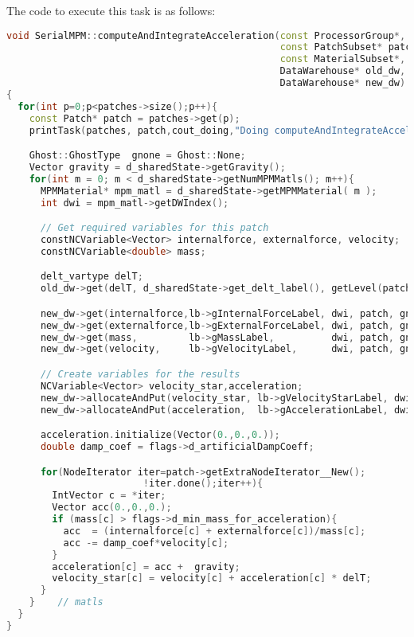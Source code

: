 The code to execute this task is as follows:

\begin{lstlisting}[language=Cpp]
void SerialMPM::computeAndIntegrateAcceleration(const ProcessorGroup*,
                                                const PatchSubset* patches,
                                                const MaterialSubset*,
                                                DataWarehouse* old_dw,
                                                DataWarehouse* new_dw)
{
  for(int p=0;p<patches->size();p++){
    const Patch* patch = patches->get(p);
    printTask(patches, patch,cout_doing,"Doing computeAndIntegrateAcceleration\t\t\t\t");

    Ghost::GhostType  gnone = Ghost::None;
    Vector gravity = d_sharedState->getGravity();
    for(int m = 0; m < d_sharedState->getNumMPMMatls(); m++){
      MPMMaterial* mpm_matl = d_sharedState->getMPMMaterial( m );
      int dwi = mpm_matl->getDWIndex();

      // Get required variables for this patch
      constNCVariable<Vector> internalforce, externalforce, velocity;
      constNCVariable<double> mass;

      delt_vartype delT;
      old_dw->get(delT, d_sharedState->get_delt_label(), getLevel(patches) );

      new_dw->get(internalforce,lb->gInternalForceLabel, dwi, patch, gnone, 0);
      new_dw->get(externalforce,lb->gExternalForceLabel, dwi, patch, gnone, 0);
      new_dw->get(mass,         lb->gMassLabel,          dwi, patch, gnone, 0);
      new_dw->get(velocity,     lb->gVelocityLabel,      dwi, patch, gnone, 0);

      // Create variables for the results
      NCVariable<Vector> velocity_star,acceleration;
      new_dw->allocateAndPut(velocity_star, lb->gVelocityStarLabel, dwi, patch);
      new_dw->allocateAndPut(acceleration,  lb->gAccelerationLabel, dwi, patch);

      acceleration.initialize(Vector(0.,0.,0.));
      double damp_coef = flags->d_artificialDampCoeff;

      for(NodeIterator iter=patch->getExtraNodeIterator__New();
                        !iter.done();iter++){
        IntVector c = *iter;
        Vector acc(0.,0.,0.);
        if (mass[c] > flags->d_min_mass_for_acceleration){
          acc  = (internalforce[c] + externalforce[c])/mass[c];
          acc -= damp_coef*velocity[c];
        }
        acceleration[c] = acc +  gravity;
        velocity_star[c] = velocity[c] + acceleration[c] * delT;
      }
    }    // matls
  }
}
\end{lstlisting}

